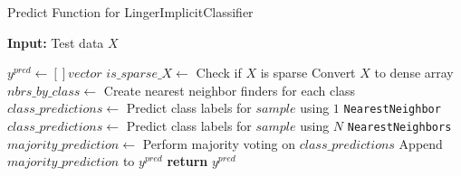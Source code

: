 \documentclass[a4paper, 12pt]{report}
\begin{document}
\begin{algorithm}[H]
    \caption{Predict Function for LingerImplicitClassifier}
    \textbf{Input:} Test data $X$
    \label{alg:linger_implicit_classifier_predict}
    \begin{algorithmic}[1]
            \State $y^{pred} \gets [] vector$
            \State $is\_sparse\_X \gets$ Check if $X$ is sparse
                \State Convert $X$ to dense array
            \EndIf
            \State $nbrs\_by\_class \gets$ Create nearest neighbor finders for each class
                    \State $class\_predictions \gets$ Predict class labels for $sample$ using $1$ \texttt{NearestNeighbor}
                \Else
                    \State $class\_predictions \gets$ Predict class labels for $sample$ using $N$ \texttt{NearestNeighbors}
                \EndIf
                \State $majority\_prediction \gets$ Perform majority voting on $class\_predictions$
                \State Append $majority\_prediction$ to $y^{pred}$
            \EndFor
            \State \textbf{return} $y^{pred}$
        \EndFunction
    \end{algorithmic}
\end{algorithm}
\end{document}
